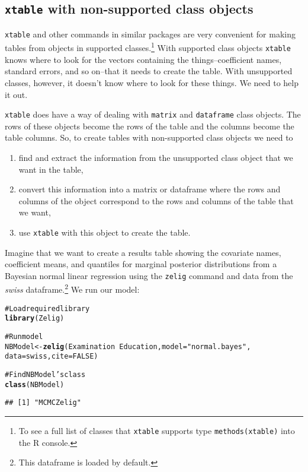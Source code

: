 \documentclass[ChapterTOCs,krantz1]{krantz}\usepackage{graphicx, color}
\makeatletter
\newcommand{\hlfunctioncall}[1]{\textcolor[rgb]{0.501960784313725,0,0.329411764705882}{\textbf{#1}}}%
\newcommand{\hlstring}[1]{\textcolor[rgb]{0.6,0.6,1}{#1}}%
\newcommand{\hlcomment}[1]{\textcolor[rgb]{0.180392156862745,0.6,0.341176470588235}{#1}}%
\newenvironment{kframe}{%
 \def\at@end@of@kframe{}%
 \ifinner\ifhmode%
  \def\at@end@of@kframe{\end{minipage}}%
  \begin{minipage}{\columnwidth}%
 \fi\fi%
 \def\FrameCommand##1{\hskip\@totalleftmargin \hskip-\fboxsep
 \colorbox{shadecolor}{##1}\hskip-\fboxsep
     \hskip-\linewidth \hskip-\@totalleftmargin \hskip\columnwidth}%
 \MakeFramed {\advance\hsize-\width
   \@totalleftmargin\z@ \linewidth\hsize
   \@setminipage}}%
 {\par\unskip\endMakeFramed%
 \at@end@of@kframe}
\newenvironment{knitrout}{}{} %
\makeatother
\begin{document}
\subsection{\texttt{xtable} with non-supported class objects}

{\tt{xtable}} and other commands in similar packages are very convenient for making tables from objects in supported classes.\footnote{To see a full list of classes that {\tt{xtable}} supports type {\tt{methods(xtable)}} into the R console.} With supported class objects {\tt{xtable}} knows where to look for the vectors containing the things--coefficient names, standard errors, and so on--that it needs to create the table. With unsupported classes, however, it doesn't know where to look for these things. We need to help it out. 

{\tt{xtable}} does have a way of dealing with {\tt{matrix}} and {\tt{dataframe}} class objects. The rows of these objects become the rows of the table and the columns become the table columns. So, to create tables with non-supported class objects we need to

\begin{enumerate}
    \item find and extract the information from the unsupported class object that we want in the table, 
    \item convert this information into a matrix or dataframe where the rows and columns of the object correspond to the rows and columns of the table that we want,
    \item use {\tt{xtable}} with this object to create the table.
\end{enumerate}

Imagine that we want to create a results table showing the covariate names, coefficient means, and quantiles for marginal posterior distributions from a Bayesian normal linear regression using the {\tt{zelig}} command \cite{Goodrich2007} and data from the {\emph{swiss}} dataframe.\footnote{This dataframe is loaded by default.} We run our model:

\begin{knitrout}
\color{fgcolor}\begin{kframe}
\begin{alltt}
\hlcomment{# Load required library}
\hlfunctioncall{library}(Zelig)

\hlcomment{# Run model}
NBModel <- \hlfunctioncall{zelig}(Examination ~ Education, model = \hlstring{"normal.bayes"}, 
                    data = swiss, cite = FALSE)

\hlcomment{# Find NBModel's class}
\hlfunctioncall{class}(NBModel)
\end{alltt}
\begin{verbatim}
## [1] "MCMCZelig"
\end{verbatim}
\end{kframe}
\end{knitrout}
\end{document}
